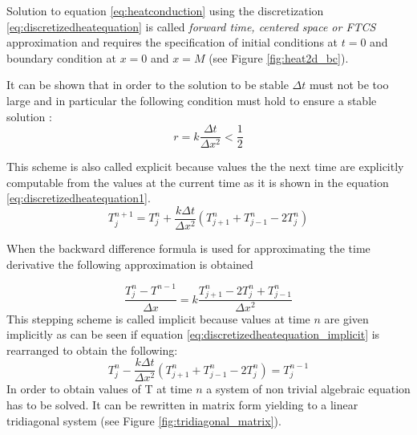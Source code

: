 Solution to equation \ref{eq:heatconduction} using the discretization \ref{eq:discretizedheatequation} is called \textit{forward time, centered space or FTCS} approximation and requires the specification of initial conditions at $t=0$ and boundary condition at $x=0$ and $x=M$ (see Figure \ref{fig:heat2d_bc}).

It can be shown that in order to the solution to be stable $\Delta t$ must not be too large and in particular the following condition must hold to ensure a stable solution \cite{isaacson:1994,anderson:1994,crank:1996}:
\[ 
 r= k \frac{\Delta t}{\Delta x^2}< \frac{1}{2}
\]

This scheme is also called explicit because values the the next time are explicitly computable from the values at the current time as it is shown in the equation \ref{eq:discretizedheatequation1}.
 \begin{equation}
  T^{n+1}_{j} = T^n_{j} + \frac{k \Delta t}{\Delta x^2} (T^n_{j+1}+T^n_{j-1}-2T^n_{j})
 \label{eq:discretizedheatequation1}
 \end{equation}

When the backward difference formula is used for approximating the time derivative the following approximation is obtained

 \begin{equation}
  \frac{T^{n}_{j} - T^{n-1}_{}}{\Delta x} = k \frac{T^n_{j+1}- 2T^n_{j} + T^n_{j-1}}{\Delta x^2}
 \label{eq:discretizedheatequation_implicit}
 \end{equation}
 This stepping scheme is called implicit because values at time $n$ are given implicitly as can be seen if equation \ref{eq:discretizedheatequation_implicit} is rearranged to obtain the following: 
 \begin{equation}
T^n_{j} - \frac{k \Delta t}{\Delta x^2} (T^n_{j+1}+T^n_{j-1}-2T^n_{j}) =   T^{n-1}_{j}
 \label{eq:discretizedheatequation1}
 \end{equation}
 In order to obtain values of T at time $n$ a system of non trivial algebraic equation has to be solved. 
 It can be rewritten in matrix form yielding to a linear tridiagonal system (see Figure \ref{fig:tridiagonal_matrix}).


